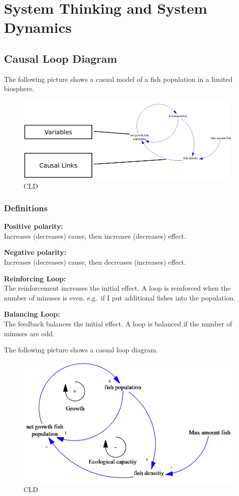 \hypertarget{system-thinking-and-system-dynamics}{%
\section{System Thinking and System
Dynamics}\label{system-thinking-and-system-dynamics}}

\hypertarget{causal-loop-diagram}{%
\subsection{Causal Loop Diagram}\label{causal-loop-diagram}}

The following picture shows a casual model of a fish population in a
limited biosphere.

\begin{figure}
\centering
\includegraphics{figures/cld.png}
\caption{CLD}
\end{figure}

\hypertarget{definitions}{%
\subsubsection{Definitions}\label{definitions}}

\textbf{Positive polarity:}\\
Increases (decreases) cause, then increases (decreases) effect.

\textbf{Negative polarity:}\\
Increases (decreases) cause, then decreases (increases) effect.

\textbf{Reinforcing Loop:}\\
The reinforcement increases the initial effect. A loop is reinforced
when the number of minuses is even. e.g.~if I put additional fishes into
the population.

\textbf{Balancing Loop:}\\
The feedback balances the initial effect. A loop is balanced if the
number of minuses are odd.

The following picture shows a casual loop diagram.

\begin{figure}
\centering
\includegraphics{figures/cldFishpopulation.png}
\caption{CLD}
\end{figure}
